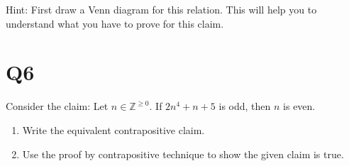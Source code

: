 \documentclass[12pt]{exam}
\begin{document}
Hint: First draw a Venn diagram for this relation. This will help you to understand what you have to prove for this claim. 


\section{Q6}
Consider the claim: Let $n \in \mathds{Z}^{\geq 0}$. If $2n^4 + n + 5$ is odd, then $n$ is even.

\begin{enumerate}
    \item Write the equivalent contrapositive claim.
    \item Use the proof by contrapositive technique to show the given claim is true.
\end{enumerate}
\end{document}
